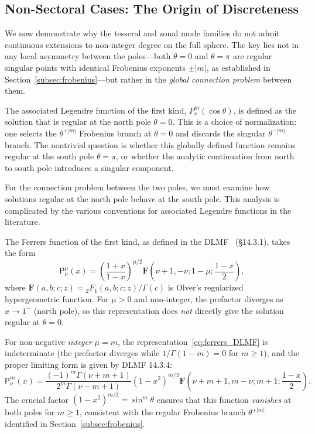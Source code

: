 \documentclass[
  aip,
  amsmath,amssymb,
  preprint
]{revtex4-1}
\begin{document}
\subsection{Non-Sectoral Cases: The Origin of Discreteness}

We now demonstrate why the tesseral and zonal mode families do not admit continuous extensions to non-integer degree on the full sphere. The key lies not in any local asymmetry between the poles---both $\theta = 0$ and $\theta = \pi$ are regular singular points with identical Frobenius exponents $\pm|m|$, as established in Section~\ref{subsec:frobenius}---but rather in the \emph{global connection problem} between them.

The associated Legendre function of the first kind, $P_\nu^m(\cos\theta)$, is defined as the solution that is regular at the north pole $\theta = 0$. This is a choice of normalization: one selects the $\theta^{+|m|}$ Frobenius branch at $\theta = 0$ and discards the singular $\theta^{-|m|}$ branch. The nontrivial question is whether this globally defined function remains regular at the south pole $\theta = \pi$, or whether the analytic continuation from north to south pole introduces a singular component.

For the connection problem between the two poles, we must examine how solutions regular at the north pole behave at the south pole. This analysis is complicated by the various conventions for associated Legendre functions in the literature.

The Ferrers function of the first kind, as defined in the DLMF~\cite{DLMF} (\S14.3.1), takes the form
\begin{equation}
\mathsf{P}_\nu^\mu(x) = \left(\frac{1+x}{1-x}\right)^{\mu/2} \mathbf{F}\left(\nu+1, -\nu; 1-\mu; \frac{1-x}{2}\right),
\label{eq:ferrers_DLMF}
\end{equation}
where $\mathbf{F}(a,b;c;z) = {}_2F_1(a,b;c;z)/\Gamma(c)$ is Olver's regularized hypergeometric function. For $\mu > 0$ and non-integer, the prefactor diverges as $x \to 1^-$ (north pole), so this representation does \emph{not} directly give the solution regular at $\theta = 0$.

For non-negative \emph{integer} $\mu = m$, the representation~\eqref{eq:ferrers_DLMF} is indeterminate (the prefactor diverges while $1/\Gamma(1-m) = 0$ for $m \geq 1$), and the proper limiting form is given by DLMF 14.3.4:
\begin{equation}
\mathsf{P}_\nu^m(x) = \frac{(-1)^m \Gamma(\nu+m+1)}{2^m \Gamma(\nu-m+1)} (1-x^2)^{m/2} \mathbf{F}\left(\nu+m+1, m-\nu; m+1; \frac{1-x}{2}\right).
\label{eq:ferrers_integer_m}
\end{equation}
The crucial factor $(1-x^2)^{m/2} = \sin^m\theta$ ensures that this function \emph{vanishes} at both poles for $m \geq 1$, consistent with the regular Frobenius branch $\theta^{+|m|}$ identified in Section~\ref{subsec:frobenius}.
\end{document}
